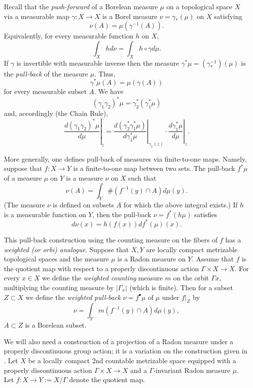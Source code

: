 \documentclass[12pt]{amsbook}%
\theoremstyle{definition}
\theoremstyle{remark}
\numberwithin{section}{chapter}
\numberwithin{subsection}{section}
\numberwithin{figure}{chapter}
\def\Ga{\Gamma}
\def\ga{\gamma}
\def\kap{}
\begin{document}
{{%

Recall that the {\em push-forward} 
of a Borelean measure $\mu$ on a topological space $X$ via a measurable map $\ga: X\to X$ is a Borel measure $\nu=\ga_*(\mu)$ on $X$ satisfying 
$$
\nu(A)=\mu(\ga^{-1}(A)). 
$$
Equivalently, for every measurable function $h$ on $X$,
$$
\int_X h d\nu= \int_X h\circ \ga d\mu. 
$$
If $\ga$ is invertible with measurable inverse then the measure $\ga^*\mu=(\ga^{-1}_*)(\mu)$ is the {\em pull-back} 
of the measure 
$\mu$. Thus, 
$$
\ga^*\mu(A)= \mu(\ga(A)) 
$$
for every measurable subset $A$. We have
$$
(\ga_1 \ga_2)^*\mu= \ga_2^*(\ga_1^*\mu) 
$$
and, accordingly (the Chain Rule),
$$
\left.\frac{d(\ga_1 \ga_2)^*\mu}{d\mu}\right\vert_z= \left. \frac{d(\ga_2^* \ga_1^*\mu)}{d\ga_1^*\mu}\right\vert_{\ga_1(z)} \cdot 
\left. \frac{d \ga_1^*\mu}{d\mu}\right\vert_{z}. 
$$


More generally, one defines pull-back of measures via finite-to-one maps. 
Namely, suppose that $f: X\to Y$ is a finite-to-one map between two sets. 
The pull-back $f^*\mu$ of a measure $\mu$ on $Y$ is a measure $\nu$ on $X$ such that  
$$
\nu(A)=\int_{Y} \# (f^{-1}(y)\cap A) d\mu(y). 
$$
(The measure $\nu$ is defined on subsets $A$ for which the above integral exists.) If $h$ is a measurable function on $Y$, then the pull-back $\nu=f^*(h\mu)$ satisfies
$$
d\nu(x)= h(f(x))d f^*(\mu)(x). 
$$

This pull-back construction using the counting measure on the fibers of $f$ has a {\em weighted (or orbi) analogue}. Suppose that $X, Y$ are locally compact metrizable 
topological spaces and the measure $\mu$ is a Radon measure on $Y$. Assume that $f$ is the quotient map with respect to a properly discontinuous 
action $\Ga\times X\to X$. For every $x\in X$ we define the {\em weighted counting} measure $m$ on the orbit $\Ga x$, multiplying the counting measure  by $|\Ga_x|$ (which is finite). Then for a subset $Z\subset X$ we define the {\em weighted pull-back} $\nu=f^\bullet \mu$ of $\mu$ under $f|_Z$ by
$$
\nu=\int_Y m(f^{-1}(y)\cap A)d\mu(y), 
$$
$A\subset Z$ is a Borelean subset. 

\medskip
We will also need a construction of a projection of a Radon measure under a properly discontinuous group action; it is a variation on the construction given in \cite[\S 2.6]{PPS}. 
Let $X$ be a locally compact 2nd countable metrizable space equipped with a properly discontinuous action $\Ga\times X\to X$ and a $\Ga$-invariant Radon measure $\mu$. Let $f: X\to Y:=X/\Ga$ denote the quotient map. 

}}
\end{document}
